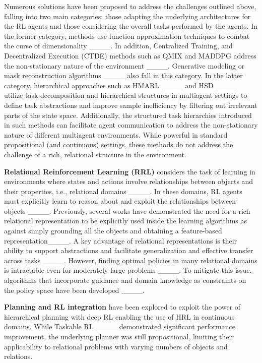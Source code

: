 Numerous solutions have been proposed to address the challenges outlined above, falling into two main categories: those adapting the underlying architectures for the RL agents and those considering the overall tasks performed by the agents. In the former category, methods use function approximation techniques to combat the curse of dimensionality ____. In addition, Centralized Training, and Decentralized Execution (CTDE) methods such as QMIX and MADDPG address the non-stationary nature of the environment ____. Generative modeling or mask reconstruction algorithms ____ also fall in this category. In the latter category, hierarchical approaches such as HMARL ____ and HSD ____ utilize task decomposition and hierarchical structures in multiagent settings to define task abstractions and improve sample inefficiency by filtering out irrelevant parts of the state space. Additionally, the structured task hierarchies introduced in such methods can facilitate agent communication to address the non-stationary nature of different multiagent environments. While powerful in standard propositional (and continuous) settings, these methods do not address the challenge of a rich, relational structure in the environment.

\textbf{Relational Reinforcement Learning (RRL)} considers the task of learning in environments where states and actions involve relationships between objects and their properties, i.e., relational domains ____. In these domains, RL agents must explicitly learn to reason about and exploit the relationships between objects ____. 
Previously, several works have demonstrated the need for a rich relational representation to be explicitly used inside the learning algorithms as against simply grounding all the objects and obtaining a feature-based representation____. A key advantage of relational representations is their ability to support abstractions and facilitate generalization and effective transfer across tasks ____.  However, finding optimal policies in many relational domains is intractable even for moderately large problems ____. To mitigate this issue, algorithms that incorporate guidance and domain knowledge as constraints on the policy space have been developed ____. 

\textbf{Planning and RL integration} have been explored to exploit the power of hierarchical planning with deep RL enabling the use of HRL in continuous domains. While Taskable RL ____ demonstrated significant performance improvement, the underlying planner was still propositional, limiting their applicability to relational problems with varying numbers of objects and relations.

